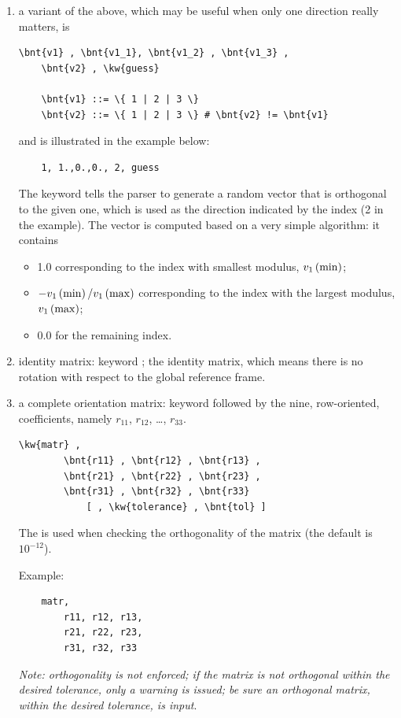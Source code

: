 \begin{enumerate}
\item a variant of the above, which may be useful when only one
direction really matters, is
\begin{Verbatim}[commandchars=\\\{\}]
    \bnt{v1} , \bnt{v1_1}, \bnt{v1_2} , \bnt{v1_3} ,
    \bnt{v2} , \kw{guess}

    \bnt{v1} ::= \{ 1 | 2 | 3 \}
    \bnt{v2} ::= \{ 1 | 2 | 3 \} # \bnt{v2} != \bnt{v1}
\end{Verbatim}
and is illustrated in the example below:
\begin{verbatim}
    1, 1.,0.,0., 2, guess
\end{verbatim}
The keyword  tells the parser to generate a random vector
that is orthogonal to the given one, which is used as the direction
indicated by the index (2 in the example).
The vector is computed based on a very simple algorithm: it contains
\begin{itemize}
        \item 1.0 corresponding to the index with smallest modulus,
        $v_1\left( \mathrm{min} \right)$;
	\item $-v_1\left( \mathrm{min} \right)/v_1\left( \mathrm{max} \right)$
	corresponding to the index with the largest modulus,
	$v_1\left( \mathrm{max} \right)$;
	\item 0.0 for the remaining index.
\end{itemize}

\item identity matrix: keyword ; the identity matrix,
which means there is no rotation with respect to the global reference
frame.

\item a complete orientation matrix: keyword 
followed by the nine, row-oriented, coefficients, namely
$ r_{11} $, $ r_{12} $, \ldots, $ r_{33} $.
\begin{Verbatim}[commandchars=\\\{\}]
    \kw{matr} ,
        \bnt{r11} , \bnt{r12} , \bnt{r13} ,
        \bnt{r21} , \bnt{r22} , \bnt{r23} ,
        \bnt{r31} , \bnt{r32} , \bnt{r33}
            [ , \kw{tolerance} , \bnt{tol} ]
\end{Verbatim}
The   is used when checking the orthogonality of the matrix (the default is $10^{-12}$).

\noindent
Example:
\begin{verbatim}
    matr,
        r11, r12, r13,
        r21, r22, r23,
        r31, r32, r33
\end{verbatim}
\emph{Note: orthogonality is not enforced; if the matrix is not orthogonal within the desired tolerance, only a warning is issued; be sure an orthogonal
matrix, within the desired tolerance, is input}.


\end{enumerate}
